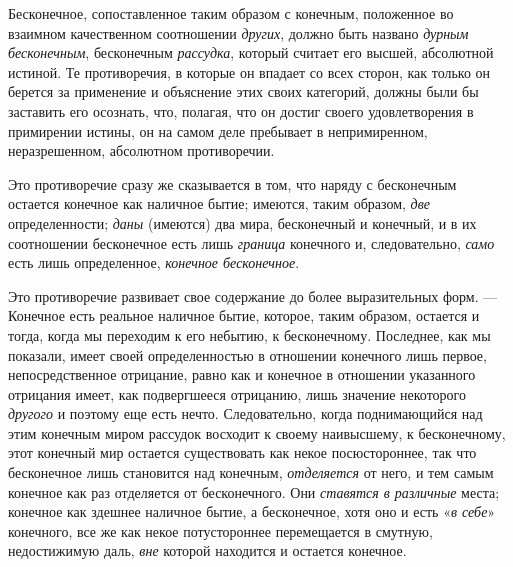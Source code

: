 Бесконечное, сопоставленное таким образом с конечным, положенное во взаимном
качественном соотношении {\em других}, должно быть
названо {\em дурным бесконечным}, бесконечным
{\em рассудка}, который считает его высшей, абсолютной
истиной. Те противоречия, в которые он впадает со всех сторон, как только
он берется за применение и объяснение этих своих категорий, должны были бы
заставить его осознать, что, полагая, что он достиг своего удовлетворения в
примирении истины, он на самом деле пребывает в непримиренном,
неразрешенном, абсолютном противоречии.

Это противоречие сразу же сказывается в том, что наряду с бесконечным
остается конечное как наличное бытие; имеются, таким образом,
{\em две} определенности;
{\em даны} (имеются) два мира, бесконечный и конечный,
и в их соотношении бесконечное есть лишь {\em граница}
конечного и, следовательно, {\em само} есть лишь
определенное, {\em конечное бесконечное}.

Это противоречие развивает свое содержание до более выразительных форм. —
Конечное есть реальное наличное бытие, которое, таким образом, остается и
тогда, когда мы переходим к его небытию, к бесконечному. Последнее, как мы
показали, имеет своей определенностью в отношении конечного лишь первое,
непосредственное отрицание, равно как и конечное в отношении указанного
отрицания имеет, как подвергшееся отрицанию, лишь значение некоторого
{\em другого} и поэтому еще есть нечто. Следовательно,
когда поднимающийся над этим конечным миром рассудок восходит к своему
наивысшему, к бесконечному, этот конечный мир остается существовать как
некое посюстороннее, так что бесконечное лишь становится над конечным,
{\em отделяется} от него, и тем самым конечное как раз
отделяется от бесконечного. Они {\em ставятся в
различные} места; конечное как здешнее наличное бытие, а бесконечное, хотя
оно и есть «{\em в себе}» конечного, все же как некое
потустороннее перемещается в смутную, недостижимую даль,
{\em вне} которой находится и остается конечное.

